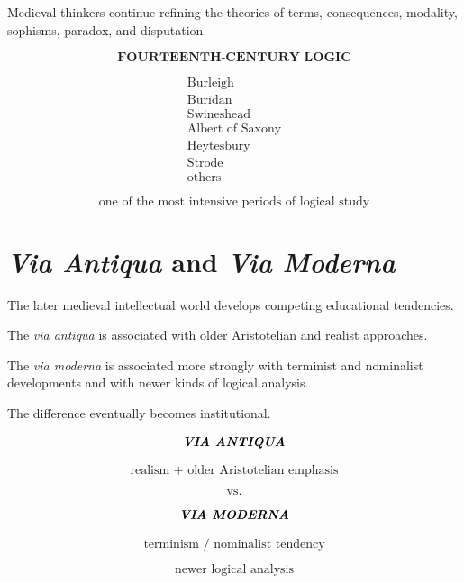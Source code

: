 \documentclass[11pt]{article}
\newcommand{\latin}[1]{\textit{#1}}
\begin{document}
Medieval thinkers continue refining the theories of terms,
consequences, modality, sophisms, paradox, and disputation.

\begin{whiteboard}
\[
\textbf{FOURTEENTH-CENTURY LOGIC}
\]

\[
\begin{array}{c}
\text{Burleigh}\\
\text{Buridan}\\
\text{Swineshead}\\
\text{Albert of Saxony}\\
\text{Heytesbury}\\
\text{Strode}\\
\text{others}
\end{array}
\]

\[
\boxed{\text{one of the most intensive periods of logical study}}
\]
\end{whiteboard}

\section{\textit{Via Antiqua} and \textit{Via Moderna}}

The later medieval intellectual world develops competing
educational tendencies.

The \latin{via antiqua} is associated with older Aristotelian and
realist approaches.

The \latin{via moderna} is associated more strongly with terminist
and nominalist developments and with newer kinds of logical
analysis.

The difference eventually becomes institutional.

\begin{whiteboard}
\[
\textbf{\latin{VIA ANTIQUA}}
\]

\[
\text{realism + older Aristotelian emphasis}
\]

\[
\text{vs.}
\]

\[
\textbf{\latin{VIA MODERNA}}
\]

\[
\text{terminism / nominalist tendency}
\]

\[
\text{newer logical analysis}
\]
\end{whiteboard}

\end{document}

